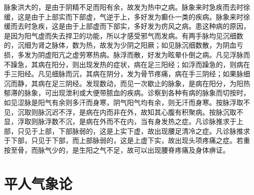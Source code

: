\documentclass[a4paper,12pt,UTF8,twoside]{ctexbook}
\begin{document}
脉象洪大的，是由于阴精不足而阳有余，故发为热中之病。脉象来时急疾而去时徐缓，这是由于上部实而下部虚，气逆于上，多好发为癫仆一类的疾病。脉象来时徐缓而去时急疾，这是由于上部虚而下部实，多好发为疠风之病。患这种病的原因，是因为阳气虚而失去捍卫的功能，所以才感受邪气而发病。有两手脉均见沉细数的，沉细为肾之脉体，数为热，故发为少阴之阳厥；如见脉沉细数散，为阴血亏损，多发为阴虚阳亢之虚劳寒热病。脉浮而散，好发为眩晕仆倒之病。凡见浮脉而不躁急，其病在阳分，则出现发热的症状，病在足三阳经；如浮而躁急的，则病在手三阳经。凡见细脉而沉，其病在阴分，发为骨节疼痛，病在手三阴经；如果脉细沉而静，其病在足三阴经。发现数动，而见一次歇止的脉象，是病在阳分，为阳热郁滞的脉象，可出现泄利或大便带脓血的疾病。诊察到各种有病的脉象而切按时，如见涩脉是阳气有余则多汗而身寒，阴气阳气均有余，则无汗而身寒。按脉浮取不见，沉取则脉沉迟不浮，是病在内而非在外，故知其心腹有积聚病。按脉沉取不显，浮取则脉浮数不沉，是病在外而不在内，当有身发热之症。凡诊脉推求于上部，只见于上部，下部脉弱的，这是上实下虚，故出现腰足清冷之症。凡诊脉推求于下部，只见于下部，而上部脉弱的，这是上虚下实，故出现头项疼痛之症。若重按至骨，而脉气少的，是生阳之气不足，故可以出现腰脊疼痛及身体痹证。

\chapter{平人气象论}
\end{document}
